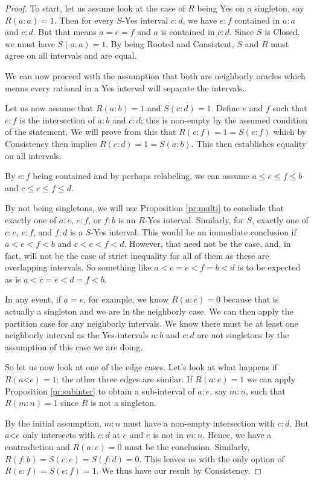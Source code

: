 \documentclass[12pt]{article}
\theoremstyle{remark}
\newcommand{\lt}{\mathord{<}}
\begin{document}
\begin{proof}
To start, let us assume look at the case of $R$ being Yes on a singleton, say $R(a:a) = 1$. Then for every $S$-Yes interval $c:d$, we have $e:f$ contained in $a:a$ and $c:d$. But that means $a=e=f$ and $a$ is contained in $c:d$. Since $S$ is Closed, we must have $S(a:a)=1$. By being Rooted and Consistent, $S$ and $R$ must agree on all intervals and are equal. 

We can now proceed with the assumption that both are neighborly oracles which means every rational in a Yes interval will separate the intervals. 

Let us now assume that $R(a:b) = 1$ and $S(c:d) = 1$. Define $e$ and $f$ such that $e:f$ is the intersection of $a:b$ and $c:d$; this is non-empty by the assumed condition of the statement. We will prove from this that $R(e:f)=1 = S(e:f)$ which by Consistency then implies $R(c:d) = 1 = S(a:b)$. This then establishes equality on all intervals. 

By $e:f$ being contained and by perhaps relabeling, we can assume $a \leq e \leq f \leq b$ and $c \leq e \leq f \leq d$. 

By not being singletons, we will use Proposition \ref{pr:multi} to conclude that exactly one of $a:e$, $e:f$, or $f:b$ is an $R$-Yes interval. Similarly, for $S$, exactly one of $c:e$, $e:f$, and $f:d$ is a $S$-Yes interval. This would be an immediate conclusion if $a < e < f < b$ and $c < e < f < d$. However, that need not be the case, and, in fact, will not be the case of strict inequality for all of them as these are overlapping intervals. So something like $a < c = e < f = b < d$ is to be expected as is $a < c = e < d = f < b$. 

In any event, if $a=e$, for example, we know $R(a:e) = 0$ because that is actually a singleton and we are in the neighborly case. We can then apply the partition case for any neighborly intervals. We know there must be at least one neighborly interval as the Yes-intervals $a:b$ and $c:d$ are not singletons by the assumption of this case we are doing. 

So let us now look at one of the edge cases. Let's look at what happens if $R(a\lt e) = 1$; the other three edges are similar. If $R(a:e) =1$ we can apply Proposition \ref{pr:subinter} to obtain a sub-interval of $a:e$, say $m:n$, such that $R(m:n) = 1$ since $R$ is not a singleton. 

By the initial assumption, $m:n$ must have a non-empty intersection with $c:d$. But $a\lt e$ only intersects with $c:d$ at $e$ and $e$ is not in $m:n$. Hence, we have a contradiction and $R(a:e)=0$ must be the conclusion. Similarly, $R(f:b) = S(c:e) = S(f:d) = 0$. This leaves us with the only option of $R(e:f) = S(e:f) = 1$. We thus have our result by Consistency.  

\end{proof}
\end{document}
